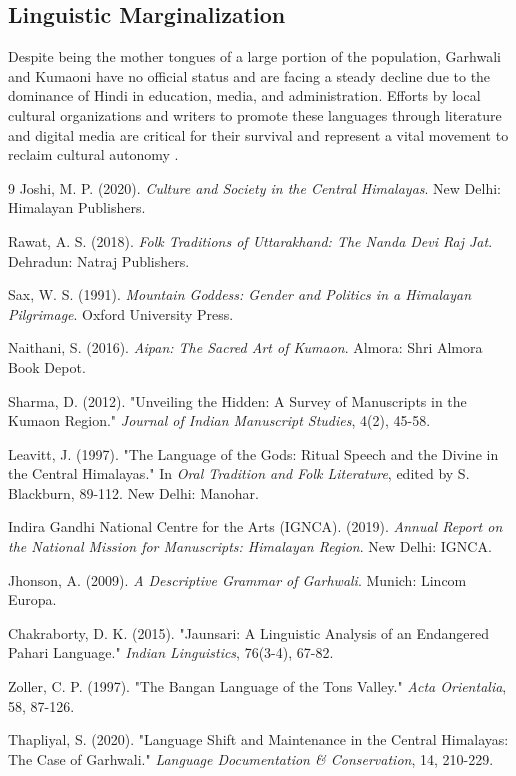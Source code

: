 \documentclass[12pt]{article}
\begin{document}
\subsection{Linguistic Marginalization}
Despite being the mother tongues of a large portion of the population, Garhwali and Kumaoni have no official status and are facing a steady decline due to the dominance of Hindi in education, media, and administration. Efforts by local cultural organizations and writers to promote these languages through literature and digital media are critical for their survival and represent a vital movement to reclaim cultural autonomy \cite{thapliyal2020language}.

\begin{thebibliography}{9}
  Joshi, M. P. (2020). \textit{Culture and Society in the Central Himalayas}. New Delhi: Himalayan Publishers.

  Rawat, A. S. (2018). \textit{Folk Traditions of Uttarakhand: The Nanda Devi Raj Jat}. Dehradun: Natraj Publishers.

  Sax, W. S. (1991). \textit{Mountain Goddess: Gender and Politics in a Himalayan Pilgrimage}. Oxford University Press.

  Naithani, S. (2016). \textit{Aipan: The Sacred Art of Kumaon}. Almora: Shri Almora Book Depot.

  Sharma, D. (2012). "Unveiling the Hidden: A Survey of Manuscripts in the Kumaon Region." \textit{Journal of Indian Manuscript Studies}, 4(2), 45-58.

  Leavitt, J. (1997). "The Language of the Gods: Ritual Speech and the Divine in the Central Himalayas." In \textit{Oral Tradition and Folk Literature}, edited by S. Blackburn, 89-112. New Delhi: Manohar.

  Indira Gandhi National Centre for the Arts (IGNCA). (2019). \textit{Annual Report on the National Mission for Manuscripts: Himalayan Region}. New Delhi: IGNCA.

  Jhonson, A. (2009). \textit{A Descriptive Grammar of Garhwali}. Munich: Lincom Europa.

  Chakraborty, D. K. (2015). "Jaunsari: A Linguistic Analysis of an Endangered Pahari Language." \textit{Indian Linguistics}, 76(3-4), 67-82.

  Zoller, C. P. (1997). "The Bangan Language of the Tons Valley." \textit{Acta Orientalia}, 58, 87-126.

  Thapliyal, S. (2020). "Language Shift and Maintenance in the Central Himalayas: The Case of Garhwali." \textit{Language Documentation \& Conservation}, 14, 210-229.

\end{thebibliography}
\end{document}
